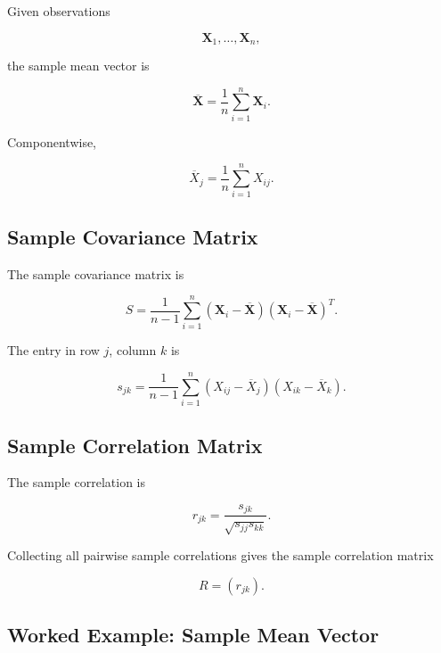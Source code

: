 Given observations

\[
\mathbf{X}_1,\ldots,\mathbf{X}_n,
\]

the sample mean vector is

\[
\boxed{
\overline{\mathbf{X}}
=
\frac1n
\sum_{i=1}^{n}
\mathbf{X}_i.
}
\]

Componentwise,

\[
\boxed{
\overline{X}_j
=
\frac1n
\sum_{i=1}^{n}
X_{ij}.
}
\]

\subsection{Sample Covariance Matrix}
\label{subsec:sample-covariance-matrix}

The sample covariance matrix is

\[
\boxed{
S
=
\frac1{n-1}
\sum_{i=1}^{n}
(
\mathbf{X}_i-\overline{\mathbf{X}}
)
(
\mathbf{X}_i-\overline{\mathbf{X}}
)^T.
}
\]

The entry in row \(j\), column \(k\) is

\[
\boxed{
s_{jk}
=
\frac1{n-1}
\sum_{i=1}^{n}
(X_{ij}-\overline{X}_j)
(X_{ik}-\overline{X}_k).
}
\]

\subsection{Sample Correlation Matrix}
\label{subsec:sample-correlation-matrix}

The sample correlation is

\[
\boxed{
r_{jk}
=
\frac{
s_{jk}
}{
\sqrt{
s_{jj}s_{kk}
}
}.
}
\]

Collecting all pairwise sample correlations gives the sample correlation
matrix

\[
\boxed{
R=(r_{jk}).
}
\]

\subsection{Worked Example: Sample Mean Vector}
\label{subsec:worked-sample-mean-vector}


